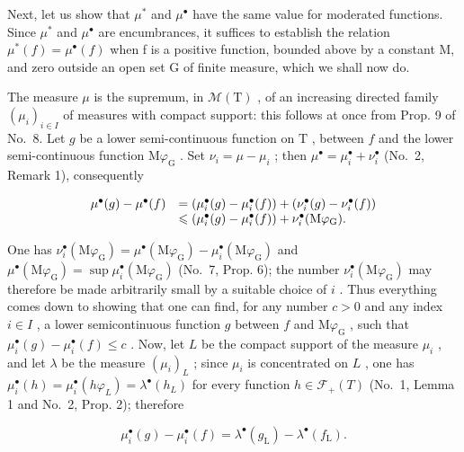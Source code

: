 Next, let us show that \(\mu^{*}\) and \(\mu^{\bullet}\) have the same value for moderated functions. Since \(\mu^{*}\) and \(\mu^{\bullet}\) are encumbrances, it suffices to establish the relation \(\mu^{*}(f)=\mu^{\bullet}(f)\) when f is a positive function, bounded above by a constant M, and zero outside an open set G of finite measure, which we shall now do.

The measure \(\mu\) is the supremum, in \(\mathcal{M}(\mathrm{T})\) , of an increasing directed family \((\mu_i)_{i\in I}\) of measures with compact support: this follows at once from Prop. 9 of No.~8. Let \(g\) be a lower semi-continuous function on \(\mathrm{T}\) , between \(f\) and the lower semi-continuous function \(\mathrm{M}\varphi_{\mathrm{G}}\) . Set \(\nu_i = \mu - \mu_i\) ; then \(\mu^{\bullet} = \mu_i^{\bullet} + \nu_i^{\bullet}\) (No.~2, Remark 1), consequently

\[
\begin{array}{r l} \mu^ {\bullet} (g) - \mu^ {\bullet} (f) & = (\mu_ {i} ^ {\bullet} (g) - \mu_ {i} ^ {\bullet} (f)) + (\nu_ {i} ^ {\bullet} (g) - \nu_ {i} ^ {\bullet} (f)) \\ & \leqslant (\mu_ {i} ^ {\bullet} (g) - \mu_ {i} ^ {\bullet} (f)) + \nu_ {i} ^ {\bullet} (\mathrm{M} \varphi_ {\mathrm{G}}). \end{array}
\]

One has \(\nu_{i}^{\bullet}(\mathrm{M}\varphi_{\mathrm{G}}) = \mu^{\bullet}(\mathrm{M}\varphi_{\mathrm{G}}) - \mu_{i}^{\bullet}(\mathrm{M}\varphi_{\mathrm{G}})\) and \(\mu^{\bullet}(\mathrm{M}\varphi_{\mathrm{G}}) = \sup \mu_{i}^{\bullet}(\mathrm{M}\varphi_{\mathrm{G}})\) (No.~7, Prop. 6); the number \(\nu_{i}^{\bullet}(\mathrm{M}\varphi_{\mathrm{G}})\) may therefore be made arbitrarily small by a suitable choice of \(i\) . Thus everything comes down to showing that one can find, for any number \(c > 0\) and any index \(i \in I\) , a lower semicontinuous function \(g\) between \(f\) and \(\mathrm{M}\varphi_{\mathrm{G}}\) , such that \(\mu_{i}^{\bullet}(g) - \mu_{i}^{\bullet}(f) \leqslant c\) . Now, let \(L\) be the compact support of the measure \(\mu_{i}\) , and let \(\lambda\) be the measure \((\mu_{i})_{L}\) ; since \(\mu_{i}\) is concentrated on \(L\) , one has \(\mu_{i}^{\bullet}(h) = \mu_{i}^{\bullet}(h\varphi_{L}) = \lambda^{\bullet}(h_{L})\) for every function \(h \in \mathcal{F}_{+}(T)\) (No.~1, Lemma 1 and No.~2, Prop. 2); therefore

\[
\mu_ {i} ^ {\bullet} (g) - \mu_ {i} ^ {\bullet} (f) = \lambda^ {\bullet} (g _ {\mathrm{L}}) - \lambda^ {\bullet} (f _ {\mathrm{L}}).
\]

